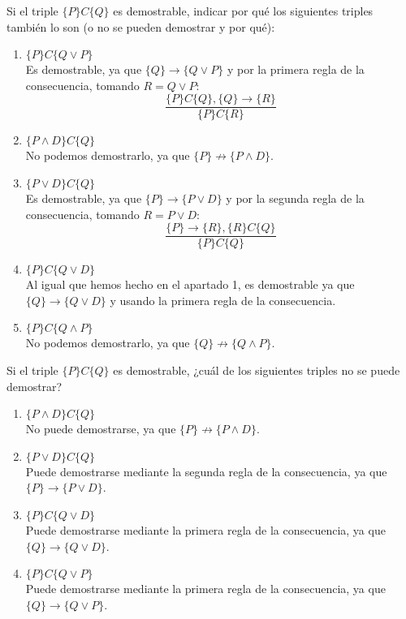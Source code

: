 \begin{ejercicio}
    Si el triple $\{P\} C \{Q\}$ es demostrable, indicar por qué los siguientes triples también lo son (o no se pueden demostrar y por qué):
    \begin{enumerate}
        \item $\{P\} C \{Q \lor P\}$\\
           Es demostrable, ya que $\{Q\}\rightarrow\{Q \lor P\}$ y por la primera regla de la consecuencia, tomando $R=Q \lor P$:
         \begin{equation*}
            \dfrac{\{P\}C\{Q\}, \{Q\}\rightarrow\{R\}}{\{P\}C\{R\}}
        \end{equation*}

        \item $\{P \land D\} C \{Q\}$\\
            No podemos demostrarlo, ya que $\{P\}\not\rightarrow\{P \land D\}$.
        \item $\{P \lor D\} C \{Q\}$\\
            Es demostrable, ya que $\{P\}\rightarrow\{P \lor D\}$ y por la segunda regla de la consecuencia, tomando $R=P \lor D$:
        \begin{equation*}
            \dfrac{\{P\}\rightarrow\{R\},\{R\}C\{Q\}}{\{P\}C\{Q\}}
        \end{equation*}

        \item $\{P\} C \{Q \lor D\}$\\
            Al igual que hemos hecho en el apartado 1, es demostrable ya que ${\{Q\}\rightarrow\{Q \lor D\}}$ y usando la primera regla de la consecuencia.
        \item $\{P\} C \{Q \land P\}$\\
            No podemos demostrarlo, ya que $\{Q\}\not\rightarrow\{Q \land P\}$.
    \end{enumerate}
\end{ejercicio}

\begin{ejercicio}
    Si el triple $\{P\} C \{Q\}$ es demostrable, ¿cuál de los siguientes triples no se puede demostrar?
    \begin{enumerate}
        \item $\{P \land D\} C \{Q\}$\\
            No puede demostrarse, ya que $\{P\}\not\rightarrow\{P \land D\}$.
        \item $\{P \lor D\} C \{Q\}$\\
            Puede demostrarse mediante la segunda regla de la consecuencia, ya que $\{P\}\rightarrow\{P \lor D\}$.
        \item $\{P\} C \{Q \lor D\}$\\
            Puede demostrarse mediante la primera regla de la consecuencia, ya que ${\{Q\}\rightarrow\{Q \lor D\}}$.

        \item $\{P\} C \{Q \lor P\}$\\
        Puede demostrarse mediante la primera regla de la consecuencia, ya que ${\{Q\}\rightarrow\{Q \lor P\}}$.
    \end{enumerate}
\end{ejercicio}

